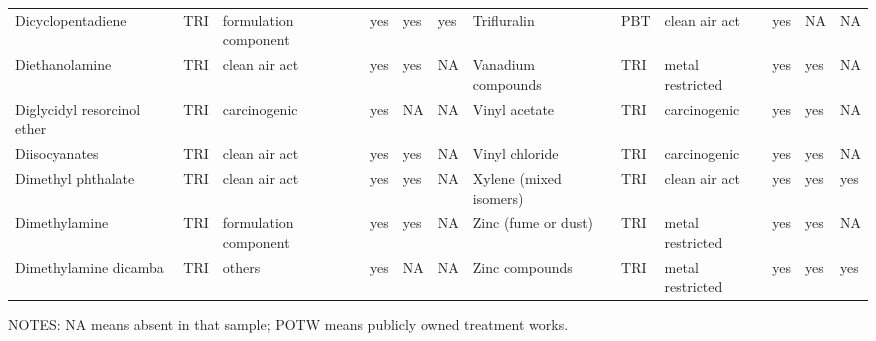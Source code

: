 \begin{table}[H]
{\begin{tabular}{llllllllllll}
            Dicyclopentadiene                                                          & TRI            & formulation component & yes    & yes     & yes  & Trifluralin                                                                                                        & PBT            & clean air act & yes & NA & NA\\
            Diethanolamine                                                             & TRI            & clean air act         & yes    & yes     & NA   & Vanadium compounds                                                                                                 & TRI            & metal restricted & yes & yes & NA\\
            Diglycidyl resorcinol ether                                                & TRI            & carcinogenic          & yes    & NA      & NA   & Vinyl acetate                                                                                                      & TRI            & carcinogenic & yes & yes & NA\\
            Diisocyanates                                                              & TRI            & clean air act         & yes    & yes     & NA   & Vinyl chloride                                                                                                     & TRI            & carcinogenic          & yes    & yes & NA\\
            Dimethyl phthalate                                                         & TRI            & clean air act         & yes    & yes     & NA   & Xylene (mixed isomers)                                                                                             & TRI            & clean air act & yes & yes & yes\\
            Dimethylamine                                                              & TRI            & formulation component & yes    & yes     & NA   & Zinc (fume or dust)                                                                                                & TRI            & metal restricted & yes & yes & NA\\
            Dimethylamine dicamba                                                      & TRI            & others                & yes    & NA      & NA   & Zinc compounds                                                                                                     & TRI            & metal restricted      & yes & yes & yes\\ \bottomrule\bottomrule
        \end{tabular}
    }
    \begin{minipage}
        \linewidth
        \vspace{0.01in}
        \tiny NOTES: NA means absent in that sample; POTW means publicly owned treatment works.
    \end{minipage}
\end{table}

